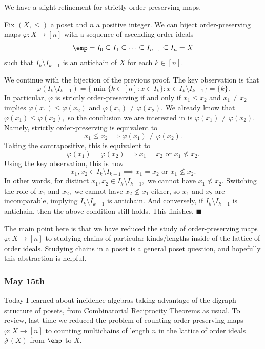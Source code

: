 We have a slight refinement for strictly order-preserving maps.
\begin{proposition}
    Fix $(X,\le)$ a poset and $n$ a positive integer. We can biject order-preserving maps $\varphi:X\to[n]$ with a sequence of ascending order ideals
    \[\emp=I_0\subseteq I_1\subseteq\cdots\subseteq I_{n-1}\subseteq I_n=X\]
    such that $I_k\setminus I_{k-1}$ is an antichain of $X$ for each $k\in[n].$
\end{proposition}
We continue with the bijection of the previous proof. The key observation is that
\[\varphi(I_k\setminus I_{k-1})=\big\{\min\{k\in[n]:x\in I_k\}:x\in I_k\setminus I_{k-1}\big\}=\{k\}.\]
In particular, $\varphi$ is strictly order-preserving if and only if $x_1\le x_2$ and $x_1\ne x_2$ implies $\varphi(x_1)\le\varphi(x_2)$ and $\varphi(x_1)\ne\varphi(x_2).$ We already know that $\varphi(x_1)\le\varphi(x_2),$ so the conclusion we are interested in is $\varphi(x_1)\ne\varphi(x_2).$ Namely, strictly order-preserving is equivalent to
\[x_1\lneq x_2\implies\varphi(x_1)\ne\varphi(x_2).\]
Taking the contrapositive, this is equivalent to
\[\varphi(x_1)=\varphi(x_2)\implies x_1=x_2\text{ or }x_1\not\le x_2.\]
Using the key observation, this is now
\[x_1,x_2\in I_k\setminus I_{k-1}\implies x_1=x_2\text{ or }x_1\not\le x_2.\]
In other words, for distinct $x_1,x_2\in I_k\setminus I_{k-1},$ we cannot have $x_1\not\le x_2.$ Switching the role of $x_1$ and $x_2,$ we cannot have $x_2\not\le x_1$ either, so $x_1$ and $x_2$ are incomparable, implying $I_k\setminus I_{k-1}$ is antichain. And conversely, if $I_k\setminus I_{k-1}$ is antichain, then the above condition still holds. This finishes. $\blacksquare$

The main point here is that we have reduced the study of order-preserving maps $\varphi:X\to[n]$ to studying chains of particular kinds/lengths inside of the lattice of order ideals. Studying chains in a poset is a general poset question, and hopefully this abstraction is helpful.

\subsubsection{May 15th}
Today I learned about incidence algebras taking advantage of the digraph structure of posets, from \href{https://web.archive.org/web/20201112023302/http://math.sfsu.edu/beck/papers/crt.pdf}{Combinatorial Reciprocity Theorems} as usual. To review, last time we reduced the problem of counting order-preserving maps $\varphi:X\to[n]$ to counting multichains of length $n$ in the lattice of order ideals $\mathcal J(X)$ from $\emp$ to $X.$

